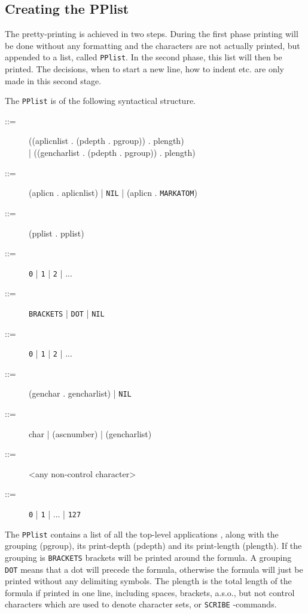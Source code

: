 \subsection{Creating the PPlist}  \label{PPlist}

The pretty-printing is achieved in two steps. During the first phase
printing will be done without any formatting and the characters are
not actually printed, but appended to a list, called {\tt PPlist}. In the second
phase, this list will then be printed. The decisions, when to start
a new line, how to indent etc. are only made in this second stage.

The {\tt PPlist} is of the following syntactical structure.

\begin{description}

\item [ ::=]  ((aplicnlist . (pdepth . pgroup)) . plength) 
           \\ | ((gencharlist . (pdepth . pgroup)) . plength)

\item [ ::=]  (aplicn . aplicnlist) | {\tt NIL} | (aplicn . {\tt MARKATOM})

\item [ ::=]  (pplist . pplist)

\item [ ::=]  {\tt 0} | {\tt 1} | {\tt 2} | ...

\item [ ::=]  {\tt BRACKETS} | {\tt DOT} | {\tt NIL}

\item [ ::=]  {\tt 0} | {\tt 1} | {\tt 2} | ...

\item [ ::=]  (genchar . gencharlist) | {\tt NIL}

\item [ ::=]  char | (ascnumber) | (gencharlist)

\item [ ::=]  <any non-control character>

\item [ ::=]  {\tt 0} | {\tt 1} | ... | {\tt 127}

\end{description}

The {\tt PPlist} contains a list of all the top-level applications , along with
the grouping (pgroup),
its print-depth (pdepth) and its print-length (plength).
If the grouping is {\tt BRACKETS} brackets will be printed around the formula.
A grouping {\tt DOT} means that
a dot will precede the formula, otherwise the formula will just be printed
without any delimiting symbols. The plength is the total
length of the formula if printed in one line, including spaces, brackets,
a.s.o., but not control characters which are used to denote character
sets, or {\tt SCRIBE} -commands.

